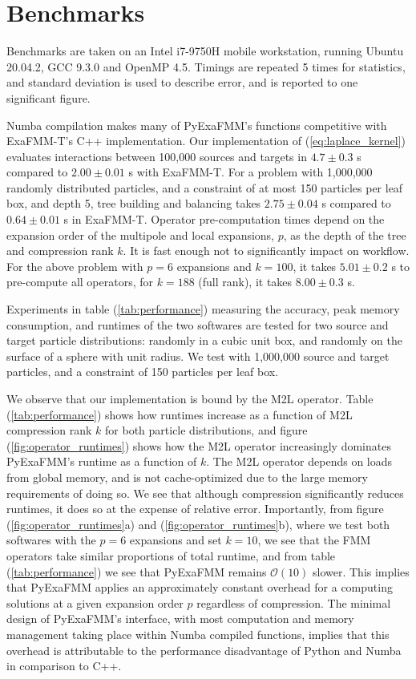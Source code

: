\documentclass{IEEEcsmag}
\begin{document}
\section{Benchmarks}

Benchmarks are taken on an Intel i7-9750H mobile workstation, running Ubuntu 20.04.2, GCC 9.3.0 and OpenMP 4.5. Timings are repeated 5 times for statistics, and standard deviation is used to describe error, and is reported to one significant figure.

Numba compilation makes many of PyExaFMM's functions competitive with ExaFMM-T's C++ implementation. Our implementation of (\ref{eq:laplace_kernel}) evaluates interactions between 100,000 sources and targets in $4.7 \pm 0.3$ s compared to $2.00 \pm 0.01$ s with ExaFMM-T. For a problem with 1,000,000 randomly distributed particles, and a constraint of at most 150 particles per leaf box, and depth 5, tree building and balancing takes $2.75 \pm 0.04$ s compared to $0.64 \pm 0.01$ s in ExaFMM-T. Operator pre-computation times depend on the expansion order of the multipole and local expansions, $p$, as the depth of the tree and compression rank $k$. It is fast enough not to significantly impact on workflow. For the above problem with $p=6$ expansions and $k=100$, it takes $5.01 \pm 0.2$ s to pre-compute all operators, for $k=188$ (full rank), it takes $8.00 \pm 0.3$ s.

Experiments in table (\ref{tab:performance}) measuring the accuracy, peak memory consumption, and runtimes of the two softwares are tested for two source and target particle distributions: randomly in a cubic unit box, and randomly on the surface of a sphere with unit radius. We test with 1,000,000 source and target particles, and a constraint of 150 particles per leaf box.

We observe that our implementation is bound by the M2L operator. Table (\ref{tab:performance}) shows how runtimes increase as a function of M2L compression rank $k$ for both particle distributions, and figure (\ref{fig:operator_runtimes}) shows how the M2L operator increasingly dominates PyExaFMM's runtime as a function of $k$. The M2L operator depends on loads from global memory, and is not cache-optimized due to the large memory requirements of doing so. We see that although compression significantly reduces runtimes, it does so at the expense of relative error. Importantly, from figure (\ref{fig:operator_runtimes}a) and (\ref{fig:operator_runtimes}b), where we test both softwares with the $p=6$ expansions and set $k=10$, we see that the FMM operators take similar proportions of total runtime, and from table (\ref{tab:performance}) we see that PyExaFMM remains $\mathcal{O}(10)$ slower. This implies that PyExaFMM applies an approximately constant overhead for a computing solutions at a given expansion order $p$ regardless of compression. The minimal design of PyExaFMM's interface, with most computation and memory management taking place within Numba compiled functions, implies that this overhead is attributable to the performance disadvantage of Python and Numba in comparison to C++.
\end{document}
